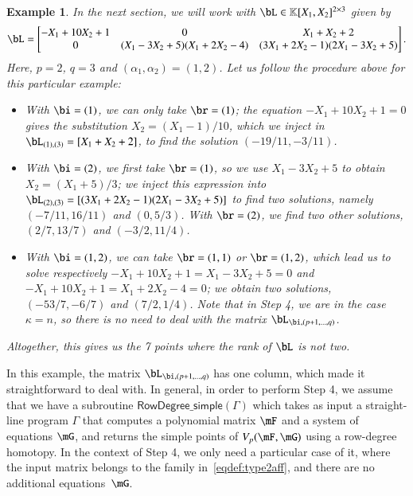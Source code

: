 \documentclass[amsthm]{elsart}
\newtheorem{example}[definition]{Example}
\begin{document}
\begin{example}\label{ex:N}
  In the next section, we will work with $\bL \in \K[X_1,X_2]^{2\times 3}$ given by
$$\bL = \left [\begin{matrix}
-X_1 + 10 X_2 + 1 & 0 & X_1+X_2 + 2\\
  0 & (X_1-3X_2+5)(X_1 + 2 X_2 - 4) & (3X_1 +2 X_2-1)(2X_1 -3X_2 +5)
    \end{matrix} \right ].$$
  Here, $p=2$, $q=3$ and $(\alpha_1,\alpha_2)=(1,2)$.
  Let us follow the procedure above for this particular example:
  \begin{itemize}
  \item With $\bi=(1)$, we can only take $\br = (1)$; the equation
    $-X_1 + 10 X_2 + 1=0$ gives the substitution $X_2=(X_1-1)/10$,
    which we inject in $\bL_{(1),(3)} = [ X_1+X_2 + 2 ]$, to find the 
    solution $(-19/11, -3/11)$.
  \item With $\bi=(2)$, we first take $\br=(1)$, so we use
    $X_1-3X_2+5$ to obtain $X_2 = (X_1+5)/3$; we inject this expression into
    $\bL_{(2),(3)}=[(3X_1 +2 X_2-1)(2X_1 -3X_2 +5)]$ to find two solutions, namely
    $(-7/11, 16/11)$ and $(0, 5/3)$. With $\br =(2)$, we find two
    other solutions, $(2/7, 13/7)$ and $(-3/2, 11/4)$.
  \item With $\bi=(1,2)$, we can take $\br=(1,1)$ or $\br=(1,2)$,
    which lead us to solve respectively $-X_1 + 10 X_2 +
    1=X_1-3X_2+5=0$ and $-X_1 + 10 X_2 + 1=X_1 + 2 X_2 - 4=0$; we
    obtain two solutions, $(-53/7, -6/7)$ and $(7/2, 1/4)$. Note that
    in Step 4, we are in the case $\kappa = n$, so there is no need to
    deal with the matrix $\bL_{\bi,(p+1, \ldots, q)}$.
  \end{itemize}
  Altogether, this gives us the 7 points where the rank of $\bL$ is
  not two.
\end{example}

In this example, the matrix $\bL_{\bi,(p+1, \ldots, q)}$ has one column,
which made it straightforward to deal with. In general, in order to
perform Step 4, we assume that we have a subroutine
$\mathsf{RowDegree\_simple}(\Gamma)$ which takes as input a
straight-line program $\Gamma$ that computes a polynomial matrix $\mF$
and a system of equations $\mG$, and returns the simple points of
$V_p(\mF,\mG)$ using a row-degree homotopy. In the context of Step 4,
we only need a particular case of it, where the input matrix belongs
to the family in~\eqref{eqdef:type2aff}, and there are no additional
equations~$\mG$.
\end{document}
